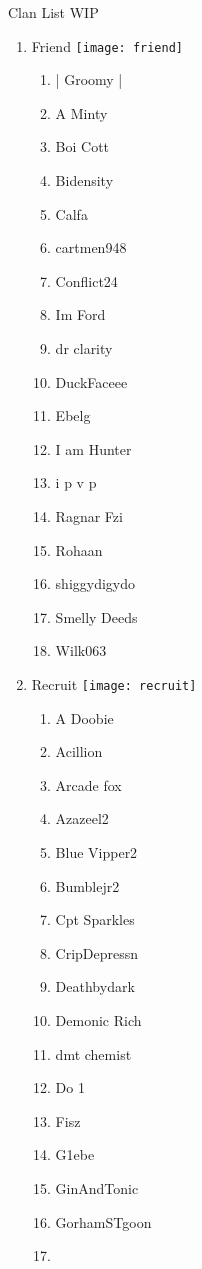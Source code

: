 \documentclass{article}
\begin{document}
Clan List WIP
\begin{enumerate}[I]
  \item 
    Friend \texttt{[image: friend]}
    \begin{enumerate}[I]
      \item
	| Groomy |
      \item
	A Minty
      \item
	Boi Cott
      \item
	Bidensity
      \item
	Calfa
      \item
	cartmen948
      \item
	Conflict24
      \item
	Im Ford
      \item
	dr clarity
      \item
	DuckFaceee
      \item
	Ebelg
      \item
	I am Hunter
      \item
	i p v p
      \item
	Ragnar Fzi
      \item
	Rohaan
      \item
	shiggydigydo
      \item
	Smelly Deeds
      \item
	Wilk063
    \end{enumerate}
  \item
    Recruit \texttt{[image: recruit]}
    \begin{enumerate}[I]
      \item
	A Doobie
      \item 
	Acillion
      \item
	Arcade fox
      \item
	Azazeel2
      \item
	Blue Vipper2
      \item
	Bumblejr2
      \item
	Cpt Sparkles
      \item
	CripDepressn
      \item
	Deathbydark
      \item
	Demonic Rich
      \item
	dmt chemist
      \item
	Do 1
      \item
	Fisz
      \item
	G1ebe
      \item
	GinAndTonic
      \item
	GorhamSTgoon
      \item

\end{enumerate}
\end{enumerate}
\end{document}
